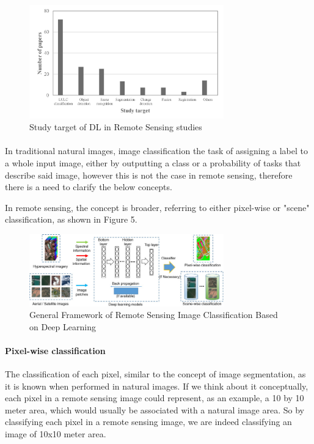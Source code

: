 \documentclass{article}
\begin{document}
    \begin{figure}[hbt!]
        \centering
        \includegraphics[width=0.75\textwidth]{study_target_ma.jpg}
        \caption{Study target of DL in Remote Sensing studies \cite{MA2019166}}
    \end{figure}

\paragraph{}
In traditional natural images, image classification the task of assigning a label to a whole input image, either by outputting a class or a probability of tasks that describe said image, however this is not the case in remote sensing, therefore there is a need to clarify the below concepts.

In remote sensing, the concept is broader, referring to either pixel-wise or "scene" classification, as shown in Figure 5.

    \begin{figure}[hbt!]
        \centering
        \includegraphics[width=0.75\textwidth]{widm1264-toc-0001-m.jpg}
        \caption{General Framework of Remote Sensing Image Classification Based on Deep Learning \cite{https://doi.org/10.1002/widm.1264}}
    \end{figure}


\paragraph{Pixel-wise classification} The classification of each pixel, similar to the concept of image segmentation, as it is known when performed in natural images. If we think about it conceptually, each pixel in a remote sensing image could represent, as an example, a 10 by 10 meter area, which would usually be associated with a natural image area. So by classifying each pixel in a remote sensing image, we are indeed classifying an image of 10x10 meter area. 
\end{document}
